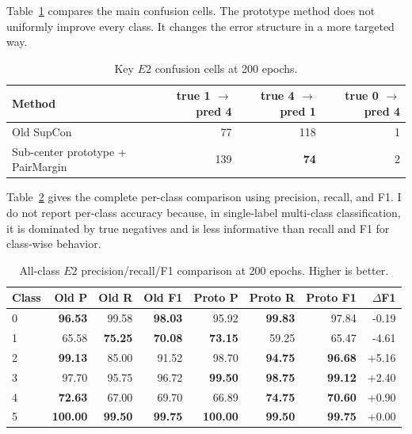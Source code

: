 \documentclass[11pt]{article}
\begin{document}
Table~\ref{tab:confusions} compares the main confusion cells. The prototype method does not uniformly improve every class. It changes the error structure in a more targeted way.

\begin{table}[H]
\centering
\caption{Key $E2$ confusion cells at 200 epochs.}
\label{tab:confusions}
\small
\begin{tabular}{lrrr}
\toprule
Method & true 1 $\rightarrow$ pred 4 & true 4 $\rightarrow$ pred 1 & true 0 $\rightarrow$ pred 4 \\
\midrule
Old SupCon & 77 & 118 & 1 \\
Sub-center prototype + PairMargin & 139 & \textbf{74} & 2 \\
\bottomrule
\end{tabular}
\end{table}

Table~\ref{tab:per_class} gives the complete per-class comparison using precision, recall, and F1. I do not report per-class accuracy because, in single-label multi-class classification, it is dominated by true negatives and is less informative than recall and F1 for class-wise behavior.

\begin{table}[H]
\centering
\caption{All-class $E2$ precision/recall/F1 comparison at 200 epochs. Higher is better.}
\label{tab:per_class}
\scriptsize
\setlength{\tabcolsep}{4pt}
\begin{tabular}{lrrrrrrr}
\toprule
Class & Old P & Old R & Old F1 & Proto P & Proto R & Proto F1 & $\Delta$F1 \\
\midrule
0 & \textbf{96.53} & 99.58 & \textbf{98.03} & 95.92 & \textbf{99.83} & 97.84 & -0.19 \\
1 & 65.58 & \textbf{75.25} & \textbf{70.08} & \textbf{73.15} & 59.25 & 65.47 & -4.61 \\
2 & \textbf{99.13} & 85.00 & 91.52 & 98.70 & \textbf{94.75} & \textbf{96.68} & +5.16 \\
3 & 97.70 & 95.75 & 96.72 & \textbf{99.50} & \textbf{98.75} & \textbf{99.12} & +2.40 \\
4 & \textbf{72.63} & 67.00 & 69.70 & 66.89 & \textbf{74.75} & \textbf{70.60} & +0.90 \\
5 & \textbf{100.00} & \textbf{99.50} & \textbf{99.75} & \textbf{100.00} & \textbf{99.50} & \textbf{99.75} & +0.00 \\
\bottomrule
\end{tabular}
\end{table}
\end{document}
